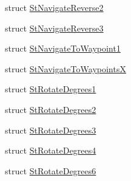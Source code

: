 \begin{DoxyCompactItemize}
\item 
struct \hyperlink{structsm__dance__bot__3_1_1StNavigateReverse2}{St\+Navigate\+Reverse2}
\item 
struct \hyperlink{structsm__dance__bot__3_1_1StNavigateReverse3}{St\+Navigate\+Reverse3}
\item 
struct \hyperlink{structsm__dance__bot__3_1_1StNavigateToWaypoint1}{St\+Navigate\+To\+Waypoint1}
\item 
struct \hyperlink{structsm__dance__bot__3_1_1StNavigateToWaypointsX}{St\+Navigate\+To\+WaypointsX}
\item 
struct \hyperlink{structsm__dance__bot__3_1_1StRotateDegrees1}{St\+Rotate\+Degrees1}
\item 
struct \hyperlink{structsm__dance__bot__3_1_1StRotateDegrees2}{St\+Rotate\+Degrees2}
\item 
struct \hyperlink{structsm__dance__bot__3_1_1StRotateDegrees3}{St\+Rotate\+Degrees3}
\item 
struct \hyperlink{structsm__dance__bot__3_1_1StRotateDegrees4}{St\+Rotate\+Degrees4}
\item 
struct \hyperlink{structsm__dance__bot__3_1_1StRotateDegrees6}{St\+Rotate\+Degrees6}
\end{DoxyCompactItemize}
